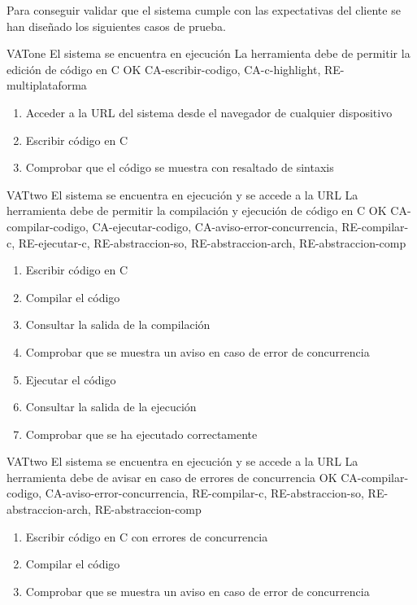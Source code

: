 Para conseguir validar que el sistema cumple con las expectativas del cliente se han diseñado los siguientes casos de prueba.

\begin{testCase}{VAT}{one}
    {El sistema se encuentra en ejecución}
    {\NA}
    {La herramienta debe de permitir la edición de código en C}
    {OK}
    {CA-escribir-codigo, CA-c-highlight, RE-multiplataforma}
    \begin{enumerate}
        \item Acceder a la URL del sistema desde el navegador de cualquier dispositivo
        \item Escribir código en C
        \item Comprobar que el código se muestra con resaltado de sintaxis
    \end{enumerate}
\end{testCase}

\begin{testCase}{VAT}{two}
    {El sistema se encuentra en ejecución y se accede a la URL}
    {\NA}
    {La herramienta debe de permitir la compilación y ejecución de código en C}
    {OK}
    {CA-compilar-codigo, CA-ejecutar-codigo, CA-aviso-error-concurrencia, RE-compilar-c, RE-ejecutar-c, RE-abstraccion-so, RE-abstraccion-arch, RE-abstraccion-comp}
    \begin{enumerate}
        \item Escribir código en C
        \item Compilar el código
        \item Consultar la salida de la compilación
        \item Comprobar que se muestra un aviso en caso de error de concurrencia
        \item Ejecutar el código
        \item Consultar la salida de la ejecución
        \item Comprobar que se ha ejecutado correctamente
    \end{enumerate}
\end{testCase}

\begin{testCase}{VAT}{two}
    {El sistema se encuentra en ejecución y se accede a la URL}
    {\NA}
    {La herramienta debe de avisar en caso de errores de concurrencia}
    {OK}
    {CA-compilar-codigo, CA-aviso-error-concurrencia, RE-compilar-c, RE-abstraccion-so, RE-abstraccion-arch, RE-abstraccion-comp}
    \begin{enumerate}
        \item Escribir código en C con errores de concurrencia
        \item Compilar el código
        \item Comprobar que se muestra un aviso en caso de error de concurrencia
    \end{enumerate}
\end{testCase}

